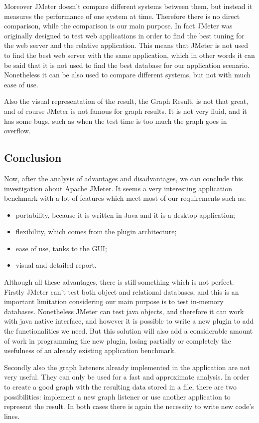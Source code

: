 Moreover JMeter doesn't compare different systems between them, but instead it measures the performance of one system at time. Therefore there is no direct comparison, while the comparison is our main purpose. In fact JMeter was originally designed to test web applications in order to find the best tuning for the web server and the relative application. This means that JMeter is not used to find the best web server with the same application, which in other words it can be said that it is not used to find the best database for our application scenario. Nonetheless it can be also used to compare different systems, but not with much ease of use.

Also the visual representation of the result, the Graph Result, is not that great, and of course JMeter is not famous for graph results. It is not very fluid, and it has some bugs, such as when the test time is too much the graph goes in overflow.

		\subsection{Conclusion}
Now, after the analysis of advantages and disadvantages, we can conclude this investigation about Apache JMeter. It seems a very interesting application benchmark with a lot of features which meet most of our requirements such as:
\begin{itemize}
	\item portability, because it is written in Java and it is a desktop application;
	\item flexibility, which comes from the plugin architecture;
	\item ease of use, tanks to the GUI;
	\item visual and detailed report.
\end{itemize}

Although all these advantages, there is still something which is not perfect. Firstly JMeter can't test both object and relational databases, and this is an important limitation considering our main purpose is to test in-memory databases. Nonetheless JMeter can test java objects, and therefore it can work with java native interface, and however it is possible to write a new plugin to add the functionalities we need. But this solution will also add a considerable amount of work in programming the new plugin, losing partially or completely the usefulness of an already existing application benchmark.

Secondly also the graph listeners already implemented in the application are not very useful. They can only be used for a fast and approximate analysis. In order to create a good graph with the resulting data stored in a file, there are two possibilities: implement a new graph listener or use another application to represent the result. In both cases there is again the necessity to write new code's lines.

